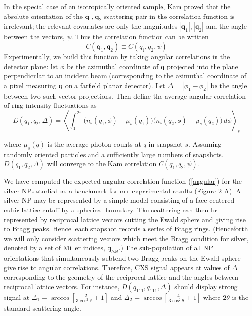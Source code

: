 \documentclass [11pt,fleqn]{article}
\def \be {\begin{equation}}
\def \ee {\end{equation}}
\begin{document}
In the special case of an isotropically oriented sample, Kam proved that the absolute orientation of the $\bm q_1, \bm q_2$ scattering pair in the correlation function is irrelevant; the relevant covariates are only the magnitudes $| \bm q_1 | , | \bm q_2 | $ and the angle between the vectors, $\psi$. Thus the correlation function can be written 
\[
C(\bm q_1, \bm q_2)  \equiv C (q_1,q_2, \psi  )
\]
Experimentally, we build this function by taking angular correlations in the detector plane: let $\phi$ be the azimuthal coordinate of $\bm q$ projected into the plane perpendicular to an incident beam (corresponding to the azimuthal coordinate of a pixel measuring $\bm q$ on a farfield planar detector). Let $\Delta = |\phi_{1} - \phi_{2}|$ be the angle between two such vector projections. Then define the average angular correlation of ring intensity fluctuations as
\be \label{angular}
D (q_1,q_2, \Delta  ) = \left \langle \int_{0}^{2\pi}  \Big ( n_s(q_1,\phi) -   \mu_s( q_1) \Big) \Big ( n_s(q_2,\phi) -   \mu_s( q_2) \Big)  \, d\phi  \right \rangle_{s}
\ee

where $\mu_s( q)$ is the average photon counts at $q$ in snapshot $s$. Assuming randomly oriented particles and a sufficiently large numbers of snapshots, $D (q_1,q_2, \Delta  )$ will converge to the Kam correlation $C (q_1,q_2, \psi  )$.

We have computed the expected angular correlation function (\ref{angular}) for the silver NPs studied as a benchmark for our experimental results (Figure 2-A). A silver NP may be represented by a simple model consisting of a face-centered-cubic lattice cutoff by a spherical boundary. The scattering can then be represented by reciprocal lattice vectors cutting the Ewald sphere and giving rise to Bragg peaks. Hence, each snapshot records a series of Bragg rings. (Henceforth we will only consider scattering vectors which meet the Bragg condition for silver, denoted by a set of Miller indices, $\bm q_{hkl}$.) The sub-population of all NP orientations that simultaneously subtend two Bragg peaks on the Ewald sphere give rise to angular correlations. Therefore,  CXS signal appears at values of $\Delta $ corresponding to the geometry of the reciprocal lattice and the angles between reciprocal lattice vectors. For instance, $D (q_{111},q_{111}, \Delta  )$ should display strong signal at $\Delta_1 = \arccos[ \frac{-2}{3\cos^{2}\theta} + 1  ]$ and $\Delta_2 = \arccos[ \frac{-4}{3\cos^{2}\theta} + 1  ]$ where $2\theta$ is the standard scattering angle.
\end{document}
